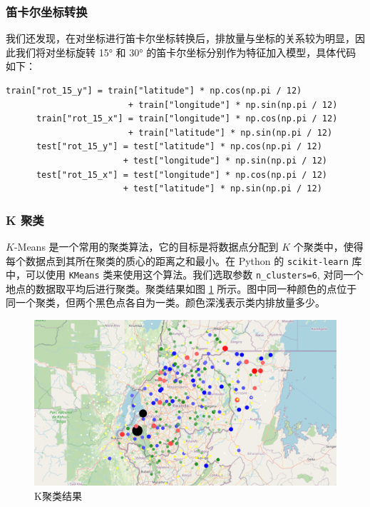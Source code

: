 \documentclass{ctexart}
\begin{document}
\subsubsection{笛卡尔坐标转换}
我们还发现，在对坐标进行笛卡尔坐标转换后，排放量与坐标的关系较为明显，因此我们将对坐标旋转 15° 和 30° 的笛卡尔坐标分别作为特征加入模型，具体代码如下：

\begin{lstlisting}[style=Python]
      train["rot_15_y"] = train["latitude"] * np.cos(np.pi / 12) 
                        + train["longitude"] * np.sin(np.pi / 12)
      train["rot_15_x"] = train["longitude"] * np.cos(np.pi / 12) 
                        + train["latitude"] * np.sin(np.pi / 12)
      test["rot_15_y"] = test["latitude"] * np.cos(np.pi / 12) 
                       + test["longitude"] * np.sin(np.pi / 12)
      test["rot_15_x"] = test["longitude"] * np.cos(np.pi / 12) 
                       + test["latitude"] * np.sin(np.pi / 12)
\end{lstlisting}

\subsubsection{K 聚类}

$K$-Means 是一个常用的聚类算法，它的目标是将数据点分配到 $K$ 个聚类中，使得每个数据点到其所在聚类的质心的距离之和最小。在 Python 的 \texttt{scikit-learn} 库中，可以使用 \texttt{KMeans} 类来使用这个算法。我们选取参数 \texttt{n\_clusters=6}, 对同一个地点的数据取平均后进行聚类。聚类结果如图 \ref{fig:10} 所示。图中同一种颜色的点位于同一个聚类，但两个黑色点各自为一类。颜色深浅表示类内排放量多少。

\begin{figure}[H]
      \centering
      \includegraphics[width=1\textwidth]{output10.png}
      \caption{K聚类结果}
      \label{fig:10}
\end{figure}
\end{document}
